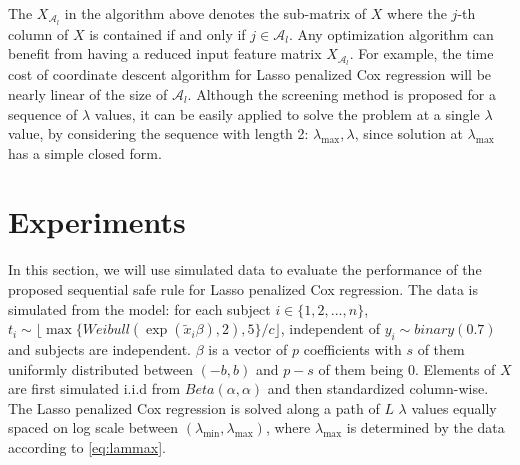 \begin{algorithm}[H]

    
\end{algorithm}

The $X_{\mathcal{A}_l}$ in the algorithm above denotes the sub-matrix of $X$ where the $j$-th column of $X$ is contained if and only if $j\in{\mathcal{A}_l}$. Any optimization algorithm can benefit from having a reduced input feature matrix $X_{\mathcal{A}_l}$. For example, the time cost of coordinate descent algorithm for Lasso penalized Cox regression \citep{simon2011regularization} will be nearly linear of the size of $\mathcal{A}_l$. Although the screening method is proposed for a sequence of $\lambda$ values, it can be easily applied to solve the problem at a single $\lambda$ value, by considering the sequence with length 2: $\lambda_{\max},\lambda$, since solution at $\lambda_{\max}$ has a simple closed form.

\section{Experiments}

In this section, we will use simulated data to evaluate the performance of the proposed sequential safe rule for Lasso penalized Cox regression. The data is simulated from the model: for each subject $i\in\{1,2,...,n\}$, $t_i\sim \lfloor\max\{Weibull(\exp(\tilde{x}_i\beta),2), 5\}/c\rfloor $, independent of $y_i\sim binary(0.7)$ and subjects are independent. $\beta$ is a vector of $p$ coefficients with $s$ of them uniformly distributed between $(-b,b)$ and $p-s$ of them being $0$. Elements of $X$ are first simulated i.i.d from $Beta(\alpha,\alpha)$ and then standardized column-wise. The Lasso penalized Cox regression is solved along a path of $L$ $\lambda$ values equally spaced on log scale between $(\lambda_{\min},\lambda_{\max})$, where $\lambda_{\max}$ is determined by the data according to \eqref{eq:lammax}. 

